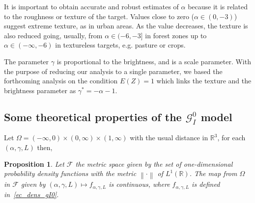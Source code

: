 \documentclass[journal]{IEEEtran}
\newtheorem{proposition}{Proposition}
\numberwithin{equation}{section}
\newcommand{\R}{\ensuremath{\mathbb{R}}}
\newcommand{\norm}[1]{\ensuremath{\left\| #1 \right\|}}
\newcommand{\pa}[1]{\ensuremath{\left( #1 \right)}}
\newcommand{\Rn}[1][n]{\ensuremath{\R^{#1}}}
\begin{document}
It is important to obtain accurate and robust estimates of $\alpha$ because  it is related to the roughness or texture of the target. 
Values close to zero ($\alpha \in (0,-3)$) suggest extreme texture, as in urban areas. 
As the value decreases, the texture is also reduced going, usually, from $\alpha \in (-6,-3]$ in forest zones up to $\alpha\in(-\infty,-6)$ in textureless targets, e.g. pasture or crops.

The parameter $\gamma$ is proportional to the brightness, and is a scale parameter.
With the purpose of reducing our analysis to a single parameter, we based the forthcoming analysis on the condition $E(Z)=1$ which links the texture and the brightness parameter as $\gamma^* =-\alpha-1$.

\subsection{Some theoretical properties of the $\mathcal{G}_I^{0}$ model}
Let $\Omega = \pa{-\infty,0}\times\pa{0,\infty}\times\pa{1,\infty}$
with the usual distance in $\Rn[3]$, for each $\pa{\alpha,\gamma,L}$ then,

\vspace{0.2cm}

\begin{proposition}
	Let $\mathcal{F}$ the metric space given by the set of one-dimensional probability density functions with the metric $\norm{\cdot}$ of $L^{1}\pa{\R}$.
	The map from $\Omega$ in $\mathcal{F}$ given by 
	$\pa{\alpha,\gamma,L}\mapsto f_{\alpha,\gamma,L}$ is continuous, where $f_{\alpha,\gamma,L}$ is defined in~\ref{ec_dens_gI0}.
\end{proposition}
\label{pr: continuidad}
\end{document}
